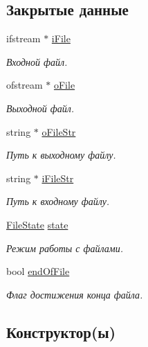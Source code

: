 \subsection*{Закрытые данные}
\begin{DoxyCompactItemize}
\item 
ifstream $\ast$ \hyperlink{class_file_manager_a91fd33cbb230ed4974a678302e906a8d}{i\+File}
\begin{DoxyCompactList}\small\item\em Входной файл. \end{DoxyCompactList}\item 
ofstream $\ast$ \hyperlink{class_file_manager_afe31c07e311212814e4a8ba01c7436a1}{o\+File}
\begin{DoxyCompactList}\small\item\em Выходной файл. \end{DoxyCompactList}\item 
string $\ast$ \hyperlink{class_file_manager_adf10708d6e8e3b4d329077af4666e147}{o\+File\+Str}
\begin{DoxyCompactList}\small\item\em Путь к выходному файлу. \end{DoxyCompactList}\item 
string $\ast$ \hyperlink{class_file_manager_aaa0e6feed45b6a92ce5c0b509bd9ceb6}{i\+File\+Str}
\begin{DoxyCompactList}\small\item\em Путь к входному файлу. \end{DoxyCompactList}\item 
\hyperlink{_structures_8h_a57306ae0f9e356347388234ed69e0ce7}{File\+State} \hyperlink{class_file_manager_a84bbcd4e3807e076ecdbd0e5dfbefa5f}{state}
\begin{DoxyCompactList}\small\item\em Режим работы с файлами. \end{DoxyCompactList}\item 
bool \hyperlink{class_file_manager_ae43001594f1ee182581741d2530620a8}{end\+Of\+File}
\begin{DoxyCompactList}\small\item\em Флаг достижения конца файла. \end{DoxyCompactList}\end{DoxyCompactItemize}


\subsection{Конструктор(ы)}
\hypertarget{class_file_manager_a62d69473c95f8df25e44d2466bb00dc5}{}\label{class_file_manager_a62d69473c95f8df25e44d2466bb00dc5} 
